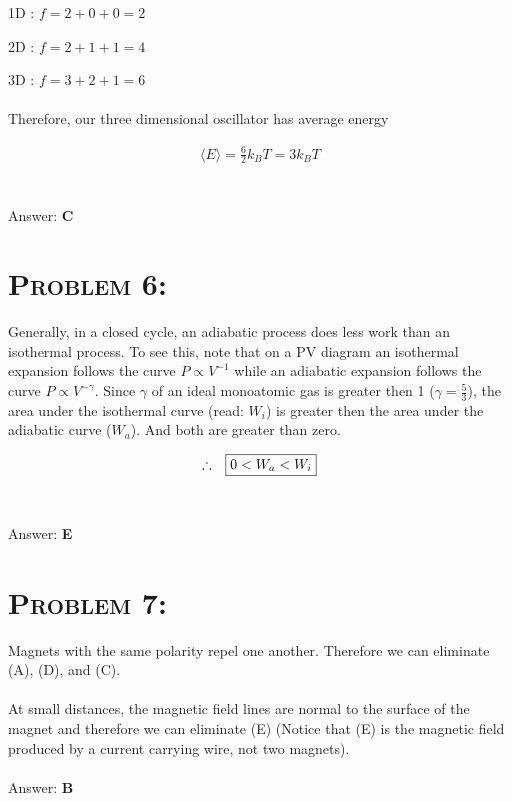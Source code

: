 \documentclass{article}
\begin{document}
\hspace{2.7in}1D : $f = 2 + 0 + 0 = 2$

\hspace{2.7in}2D : $f = 2 + 1 + 1 = 4$

\hspace{2.7in}3D : $f = 3 + 2 + 1 = 6$\\
\\
Therefore, our three dimensional oscillator has average energy

\begin{gather}
\langle  E  \rangle = \frac{6}{2} k_{B}T = \boxed{ 3 k_{B} T  }\nonumber
\end{gather}
\\\\
Answer: \textbf{\textcolor{ProcessBlue}C}\\


\section{\textsc{Problem 6:}} Generally, in a closed cycle, an adiabatic process does less work than an isothermal process. To see this, note that on a PV diagram an isothermal expansion follows the curve $P \propto V^{-1}$ while an adiabatic expansion follows the curve $P \propto V^{-\gamma}$. Since $\gamma$ of an ideal monoatomic gas is greater then 1 ($\gamma = \frac{5}{3}$), the area under the isothermal curve (read: $W_{i}$) is greater then the area under the adiabatic curve ($W_{a}$). And both are greater than zero.

\begin{align}
\therefore \hspace{.1in} \boxed{0 < W_{a} < W_{i}}\nonumber
\end{align}
\\\\
Answer: \textbf{\textcolor{ProcessBlue}E}\\


\section{\textsc{Problem 7:}} Magnets with the same polarity repel one another. Therefore we can eliminate (A), (D), and (C). \\
\\
At small distances, the magnetic field lines are normal to the surface of the magnet and therefore we can eliminate (E) (Notice that (E) is the magnetic field produced by a current carrying wire, not two magnets).
\\\\
Answer: \textbf{\textcolor{ProcessBlue}B}\\
\end{document}
